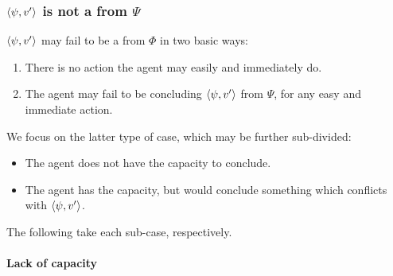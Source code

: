 \subsubsection*{\(\langle \psi, v' \rangle\) is not a  from \(\Psi\)}
\label{cha:fcs:illu:no}

\begin{note}
  \(\langle \psi, v' \rangle\) may fail to be a \fc{} from \(\Phi\) in two basic ways:

  \begin{enumerate}[label=\alph*., ref=(\alph*), noitemsep]
  \item
    There is no action the agent may easily and immediately do.
  \item
    The agent may fail to be concluding \(\langle \psi, v' \rangle\) from \(\Psi\), for any easy and immediate action.
  \end{enumerate}

  We focus on the latter type of case, which may be further sub-divided:

  \begin{itemize}[noitemsep]
  \item
    The agent does not have the capacity to conclude.
  \item
    The agent has the capacity, but would conclude something which conflicts with \(\langle \psi, v' \rangle\).
  \end{itemize}

  The following \illu{} take each sub-case, respectively.
\end{note}

\paragraph*{Lack of capacity}


